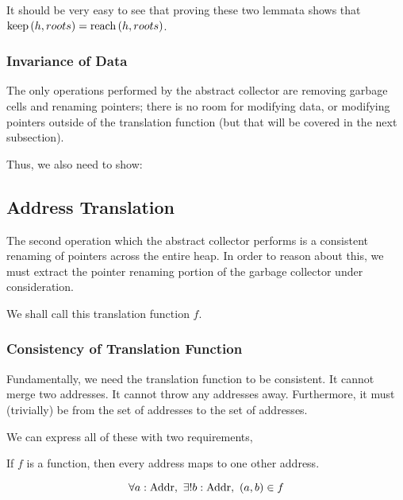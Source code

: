 It should be very easy to see that proving these two lemmata shows
that $\mathrm{keep}\left(h, roots\right) = \mathrm{reach}\left(h, roots\right)$.

\subsubsection{Invariance of Data}

The only operations performed by the abstract collector are removing
garbage cells and renaming \glspl{pointer}; there is no room for
modifying data, or modifying \glspl{pointer} outside of the
translation function (but that will be covered in the next
subsection).

Thus, we also need to show:

\begin{lemma}
\end{lemma}

\begin{lemma}
\end{lemma}

\subsection{Address Translation}

The second operation which the abstract \gls{collector} performs is a
consistent renaming of \glspl{pointer} across the entire
\gls{heap}. In order to reason about this, we must extract the
\gls{pointer} renaming portion of the \gls{garbage collector} under
consideration.

We shall call this translation function $f$.

\subsubsection{Consistency of Translation Function}

Fundamentally, we need the translation function to be consistent. It
cannot merge two addresses. It cannot throw any addresses
away. Furthermore, it must (trivially) be from the set of addresses to
the set of addresses.

We can express all of these with two requirements,

\begin{lemma}
  If $f$ is a function, then every address maps to one other address.

  \[\forall a : \mathrm{Addr},\ \exists ! b : \mathrm{Addr},\ (a, b) \in f\]
\end{lemma}

